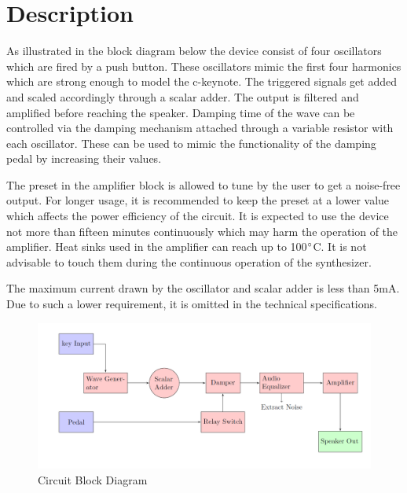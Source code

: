 \documentclass[a4paper,12pt,oneside,pdflatex,italian,final,twocolumn]{article}
\begin{document}
\section{Description}
As illustrated in the block diagram below the device consist of four oscillators which are fired by a push button. These oscillators mimic the first four harmonics which are strong enough to model the c-keynote. The triggered signals get added and scaled accordingly through a scalar adder. The output is filtered and amplified before reaching the speaker. Damping time of the wave can be controlled via the damping mechanism attached through a variable resistor with each oscillator. These can be used to mimic the functionality of the damping pedal by increasing their values.
\par
The preset in the amplifier block is allowed to tune by the user to get a noise-free output. For longer usage, it is recommended to keep the preset at a lower value which affects the power efficiency of the circuit. It is expected to use the device not more than fifteen minutes continuously which may harm the operation of the amplifier. Heat sinks used in the amplifier can reach up to 100$\degree$C. It is not advisable to touch them during the continuous operation of the synthesizer.
\par
The maximum current drawn by the oscillator and scalar adder is less than 5mA. Due to such a lower requirement, it is omitted in the technical specifications.
\begin{figure}[h]
    \centering
    \includegraphics[width=\textwidth]{flow}
    \caption{Circuit Block Diagram}
\end{figure}
\newpage
\end{document}
